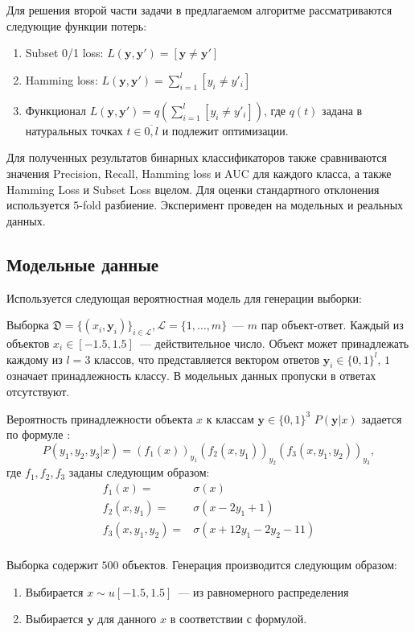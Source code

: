 \documentclass[12pt,twoside]{article}
\newcommand{\y}{\mathbf{y}}
\begin{document}
Для решения второй части задачи в предлагаемом алгоритме рассматриваются следующие функции потерь:
\begin{enumerate}
	\item Subset 0/1 loss: $L(\y, \y')=[\y\neq \y']$
	\item Hamming loss: $L(\y,\y')=\sum\limits_{i=1}^l[y_i\neq y'_i]$
	\item Функционал $L(\y,\y')=q\left(\sum\limits_{i=1}^l[y_i\neq y'_i]\right)$, где $q(t)$ задана в натуральных точках $t\in\overline{0,l}$ и подлежит оптимизации.
\end{enumerate}

Для полученных результатов бинарных классификаторов также сравниваются значения Precision, Recall, Hamming loss и AUC для каждого класса, а также Hamming Loss и Subset Loss вцелом. Для оценки стандартного отклонения используется $5$-fold разбиение. Эксперимент проведен на модельных и реальных данных.

\subsection{Модельные данные}
Используется следующая вероятностная модель для генерации выборки:

Выборка $\mathfrak{D}=\{(x_i,\y_i)\}_{i\in \mathcal{L}}, \mathcal{L}=\{1,\dots, m\}$~--- $m$ пар объект-ответ. Каждый из объектов $x_i\in [-1.5,1.5]$~--- действительное число. Объект может принадлежать каждому из $l=3$ классов, что представляется вектором ответов $\y_i\in \{0,1\}^l$, $1$ означает принадлежность классу. В модельных данных пропуски в ответах отсутствуют.

Вероятность принадлежности объекта $x$ к классам $\y\in\{0,1\}^3$ $P(\y|x)$ задается по формуле \cite{weiwei2010}:
$$P(y_1,y_2,y_3|x)=(f_1(x))_{y_1}(f_2(x, y_1))_{y_2}(f_3(x, y_1, y_2))_{y_3},$$
где $f_1,f_2,f_3$ заданы следующим образом:
$$
\begin{array}{rl}
f_1(x)= & \sigma(x)\\
f_2(x, y_1) =& \sigma(x-2y_1+1)\\
f_3(x, y_1, y_2) =& \sigma(x+12y_1-2y_2-11)\\
\end{array}
$$

Выборка содержит $500$ объектов. Генерация производится следующим образом:
\begin{enumerate}
	\item Выбирается $x\sim u[-1.5,1.5]$~--- из равномерного распределения
	\item Выбирается $\y$ для данного $x$ в соответствии с формулой.
\end{enumerate}
\end{document}
